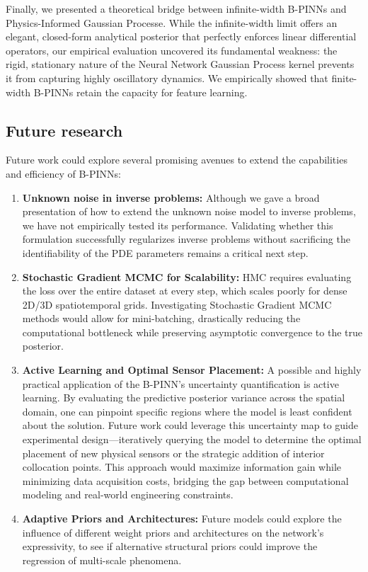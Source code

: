 \documentclass{article}
\begin{document}
Finally, we presented a theoretical bridge between infinite-width B-PINNs and Physics-Informed Gaussian Processe. While the infinite-width limit offers an elegant, closed-form analytical posterior that perfectly enforces linear differential operators, our empirical evaluation uncovered its fundamental weakness: the rigid, stationary nature of the Neural Network Gaussian Process kernel prevents it from capturing highly oscillatory dynamics. We empirically showed that finite-width B-PINNs retain the capacity for feature learning. 

\subsection{Future research}

Future work could explore several promising avenues to extend the capabilities and efficiency of B-PINNs:
\begin{enumerate}
   \item \textbf{Unknown noise in inverse problems:} Although we gave a broad presentation of how to extend the unknown noise model to inverse problems, we have not empirically tested its performance. Validating whether this formulation successfully regularizes inverse problems without sacrificing the identifiability of the PDE parameters remains a critical next step.
\item \textbf{Stochastic Gradient MCMC for Scalability:} HMC requires evaluating the loss over the entire dataset at every step, which scales poorly for dense 2D/3D spatiotemporal grids. Investigating Stochastic Gradient MCMC methods would allow for mini-batching, drastically reducing the computational bottleneck while preserving asymptotic convergence to the true posterior.
\item \textbf{Active Learning and Optimal Sensor Placement:} A possible and highly practical application of the B-PINN's uncertainty quantification is active learning. By evaluating the predictive posterior variance across the spatial domain, one can pinpoint specific regions where the model is least confident about the solution. Future work could leverage this uncertainty map to guide experimental design—iteratively querying the model to determine the optimal placement of new physical sensors or the strategic addition of interior collocation points. This approach would maximize information gain while minimizing data acquisition costs, bridging the gap between computational modeling and real-world engineering constraints.
\item \textbf{Adaptive Priors and Architectures:} Future models could explore the influence of different weight priors and architectures on the network's expressivity, to see if alternative structural priors could improve the regression of multi-scale phenomena.
\end{enumerate}
\end{document}
